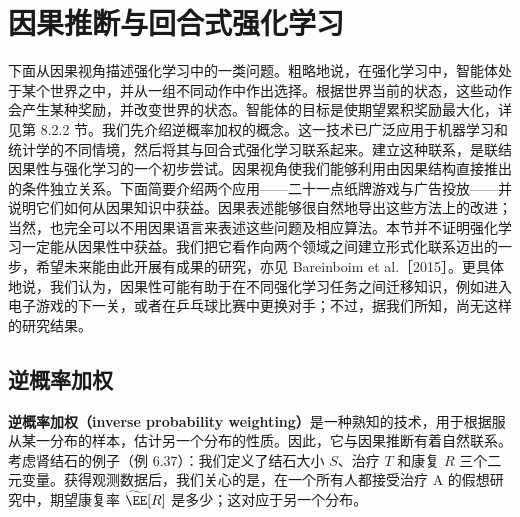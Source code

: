 \section{因果推断与回合式强化学习}
\label{sec:ch08-rl}

下面从因果视角描述强化学习中的一类问题。粗略地说，在强化学习中，智能体处于某个世界之中，并从一组不同动作中作出选择。根据世界当前的状态，这些动作会产生某种奖励，并改变世界的状态。智能体的目标是使期望累积奖励最大化，详见第 8.2.2 节。我们先介绍逆概率加权的概念。这一技术已广泛应用于机器学习和统计学的不同情境，然后将其与回合式强化学习联系起来。建立这种联系，是联结因果性与强化学习的一个初步尝试。因果视角使我们能够利用由因果结构直接推出的条件独立关系。下面简要介绍两个应用——二十一点纸牌游戏与广告投放——并说明它们如何从因果知识中获益。因果表述能够很自然地导出这些方法上的改进；当然，也完全可以不用因果语言来表述这些问题及相应算法。本节并不证明强化学习一定能从因果性中获益。我们把它看作向两个领域之间建立形式化联系迈出的一步，希望未来能由此开展有成果的研究，亦见 Bareinboim et al.［2015］。更具体地说，我们认为，因果性可能有助于在不同强化学习任务之间迁移知识，例如进入电子游戏的下一关，或者在乒乓球比赛中更换对手；不过，据我们所知，尚无这样的研究结果。

\subsection{逆概率加权}
\label{sec:ch08-ipw}

\textbf{逆概率加权（inverse probability weighting）}是一种熟知的技术，用于根据服从某一分布的样本，估计另一个分布的性质。因此，它与因果推断有着自然联系。考虑肾结石的例子（例 6.37）：我们定义了结石大小 $S$、治疗 $T$ 和康复 $R$ 三个二元变量。获得观测数据后，我们关心的是，在一个所有人都接受治疗 A 的假想研究中，期望康复率 $\widetilde{\EE}[R]$ 是多少；这对应于另一个分布。

